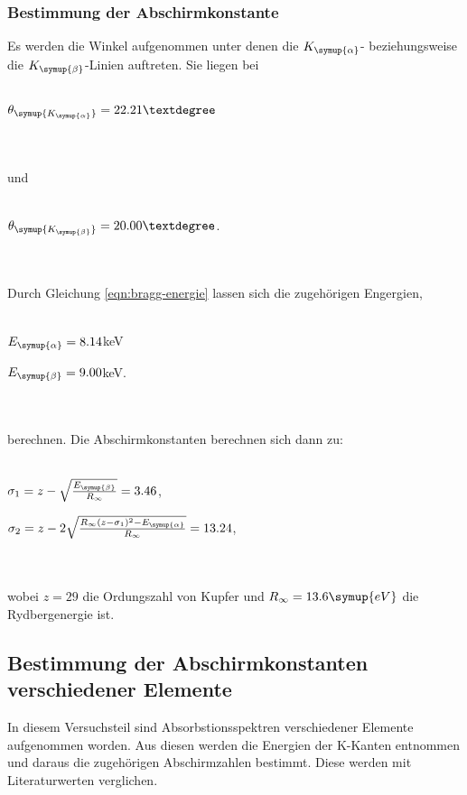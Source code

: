     \subsubsection{Bestimmung der Abschirmkonstante}
        Es werden die Winkel aufgenommen unter denen die $K_{\symup{\alpha}}$- beziehungsweise die $K_{\symup{\beta}}$-Linien auftreten.
        Sie liegen bei
        \\ \\
        \centerline{$\theta_{\symup{K_{\symup{\alpha}}}} = 22.21°$}
        \\ \\
        und 
        \\ \\
        \centerline{$\theta_{\symup{K_{\symup{\beta}}}} = 20.00°$.}
        \\ \\
        Durch Gleichung \eqref{eqn:bragg-energie} lassen sich die zugehörigen Engergien, 
        \\ \\
        \centerline{$E_{\symup{\alpha}} = 8.14 $keV}
        \centerline{$E_{\symup{\beta}} = 9.00 $keV.}
        \\ \\
        berechnen.
        Die Abschirmkonstanten berechnen sich dann zu:
        \\ \\
        \centerline{$\sigma_1 = z - \sqrt{\frac{E_{\symup{\beta}}}{R_{\infty}} } = 3.46 $,}
        \centerline{$\sigma_2 = z - 2 \sqrt{\frac{R_{\infty}(z - \sigma_1)^2 - E_{\symup{\alpha}}}{R_{\infty}}} = 13.24 $,}
        \\ \\
        wobei $z = 29$ die Ordungszahl von Kupfer und $R_{\infty} = 13.6 \symup{eV}$ die Rydbergenergie ist.
\subsection{Bestimmung der Abschirmkonstanten verschiedener Elemente} 
\label{sec:bah}
    In diesem Versuchsteil sind Absorbstionsspektren verschiedener Elemente aufgenommen worden. Aus diesen werden die Energien der 
    K-Kanten entnommen und daraus die zugehörigen Abschirmzahlen bestimmt. Diese werden mit Literaturwerten verglichen.
        
